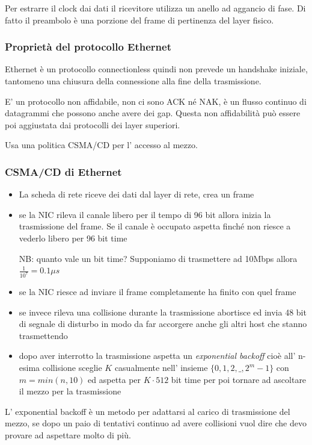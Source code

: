 Per estrarre il clock dai dati il ricevitore utilizza un anello ad aggancio di fase.
Di fatto il preambolo è una porzione del frame di pertinenza del layer fisico.

\subsubsection{Proprietà del protocollo Ethernet}
Ethernet è un protocollo connectionless quindi non prevede un handshake iniziale, tantomeno una chiusura della connessione alla fine della trasmissione.

E' un protocollo non affidabile, non ci sono ACK né NAK, è un flusso continuo di datagrammi che possono anche avere dei gap.
Questa non affidabilità può essere poi aggiustata dai protocolli dei layer superiori.

Usa una politica CSMA/CD per l' accesso al mezzo.

\subsubsection{CSMA/CD di Ethernet}
\begin{itemize}
    \item La scheda di rete riceve dei dati dal layer di rete, crea un frame

    \item se la NIC rileva il canale libero per il tempo di 96 bit allora inizia la trasmissione del frame.
    Se il canale è occupato aspetta finché non riesce a vederlo libero per 96 bit time
    
    NB: quanto vale un bit time? Supponiamo di trasmettere ad 10Mbps allora $\frac{1}{10^{7}} = 0.1\mu s$
    
    \item se la NIC riesce ad inviare il frame completamente ha finito con quel frame
    
    \item se invece rileva una collisione durante la trasmissione abortisce ed invia 48 bit di segnale di disturbo in modo da far accorgere anche gli altri host che stanno trasmettendo
    
    \item dopo aver interrotto la trasmissione aspetta un \emph{exponential backoff} cioè all' n-esima collisione sceglie $K$ casualmente nell' insieme $\{0, 1, 2, \_, 2^{m}-1\}$ con $m=min(n, 10)$ ed aspetta per $K \cdot 512$ bit time per poi tornare ad ascoltare il mezzo per la trasmissione
\end{itemize}
L' exponential backoff è un metodo per adattarsi al carico di trasmissione del mezzo, se dopo un paio di tentativi continuo ad avere collisioni vuol dire che devo provare ad aspettare molto di più.

